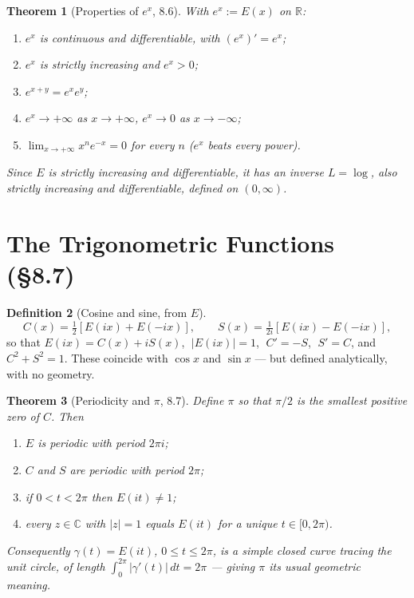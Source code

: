 \documentclass[11pt]{article}
\theoremstyle{definition}
\newtheorem{definition}{Definition}[section]
\theoremstyle{plain}
\newtheorem{theorem}[definition]{Theorem}
\newcommand{\R}{\mathbb{R}}
\newcommand{\C}{\mathbb{C}}
\newcommand{\abs}[1]{\left\lvert #1 \right\rvert}
\renewcommand{\to}{\longrightarrow}
\begin{document}
\begin{theorem}[Properties of $e^x$, 8.6]
With $e^x:=E(x)$ on $\R$:
\begin{enumerate}[label=(\alph*), leftmargin=2em, itemsep=0pt]
  \item $e^x$ is continuous and differentiable, with $(e^x)'=e^x$;
  \item $e^x$ is strictly increasing and $e^x>0$;
  \item $e^{x+y}=e^x e^y$;
  \item $e^x\to+\infty$ as $x\to+\infty$, \; $e^x\to 0$ as $x\to-\infty$;
  \item $\displaystyle\lim_{x\to+\infty} x^n e^{-x}=0$ for every $n$ ($e^x$ beats every power).
\end{enumerate}
Since $E$ is strictly increasing and differentiable, it has an inverse $L=\log$,
also strictly increasing and differentiable, defined on $(0,\infty)$.
\end{theorem}

\section{The Trigonometric Functions (\S8.7)}

\begin{definition}[Cosine and sine, from $E$]
\[
   C(x)=\tfrac12\!\left[E(ix)+E(-ix)\right],
   \qquad
   S(x)=\tfrac1{2i}\!\left[E(ix)-E(-ix)\right],
\]
so that $E(ix)=C(x)+iS(x)$, $\;\abs{E(ix)}=1$, $\;C'=-S$, $\;S'=C$, and
$C^2+S^2=1$. These coincide with $\cos x$ and $\sin x$ --- but defined
analytically, with no geometry.
\end{definition}

\begin{theorem}[Periodicity and $\pi$, 8.7]
Define $\pi$ so that $\pi/2$ is the smallest positive zero of $C$. Then
\begin{enumerate}[label=(\alph*), leftmargin=2em, itemsep=0pt]
  \item $E$ is periodic with period $2\pi i$;
  \item $C$ and $S$ are periodic with period $2\pi$;
  \item if $0<t<2\pi$ then $E(it)\neq 1$;
  \item every $z\in\C$ with $\abs{z}=1$ equals $E(it)$ for a unique $t\in[0,2\pi)$.
\end{enumerate}
Consequently $\gamma(t)=E(it)$, $0\le t\le 2\pi$, is a simple closed curve
tracing the unit circle, of length $\int_0^{2\pi}\abs{\gamma'(t)}\,dt=2\pi$ ---
giving $\pi$ its usual geometric meaning.
\end{theorem}
\end{document}
